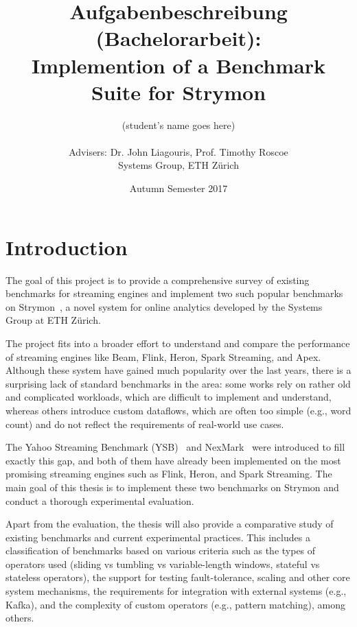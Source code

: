 \documentclass[a4paper,10pt,parskip=half]{scrartcl}
\title{Aufgabenbeschreibung (Bachelorarbeit):\\
       Implemention of a Benchmark Suite for Strymon}
\author{(student's name goes here)\\ \\ Advisers: Dr. John Liagouris, Prof. Timothy Roscoe \\
        Systems Group, ETH Z\"urich}
\date{Autumn Semester 2017}
\begin{document}
\maketitle

\section{Introduction}

The goal of this project is to provide a comprehensive survey of existing benchmarks for streaming engines and implement two such popular benchmarks on Strymon~\cite{strymon}, 
a novel system for online analytics developed by the Systems Group at ETH Z\"urich.

%
The project fits into a broader effort to understand and
compare the performance of streaming engines like Beam, Flink, Heron, Spark Streaming, and Apex.  
Although these system have gained much popularity over the last years, there is a surprising lack of standard benchmarks in the area:
some works rely on rather old and complicated workloads, which are difficult to implement and understand, whereas others introduce custom dataflows, which are often too simple (e.g., word count)
and do not reflect the requirements of real-world use cases. 

The Yahoo Streaming Benchmark (YSB)~\cite{ysb} and NexMark~\cite{nexmark} were introduced to fill exactly this gap, and both of them have already been implemented on the most promising streaming engines such as
Flink, Heron, and Spark Streaming. The main goal of this thesis is to implement these two benchmarks on Strymon and conduct a thorough experimental evaluation.

Apart from the evaluation, the thesis will also provide a comparative study of existing benchmarks and current experimental practices.
This includes a classification of benchmarks based on various criteria such as the types of operators used (sliding vs tumbling vs variable-length windows, stateful vs stateless operators),
the support for testing fault-tolerance, scaling and other core system mechanisms, the requirements for integration with external systems (e.g., Kafka), 
and the complexity of custom operators (e.g., pattern matching), among others.
\end{document}
